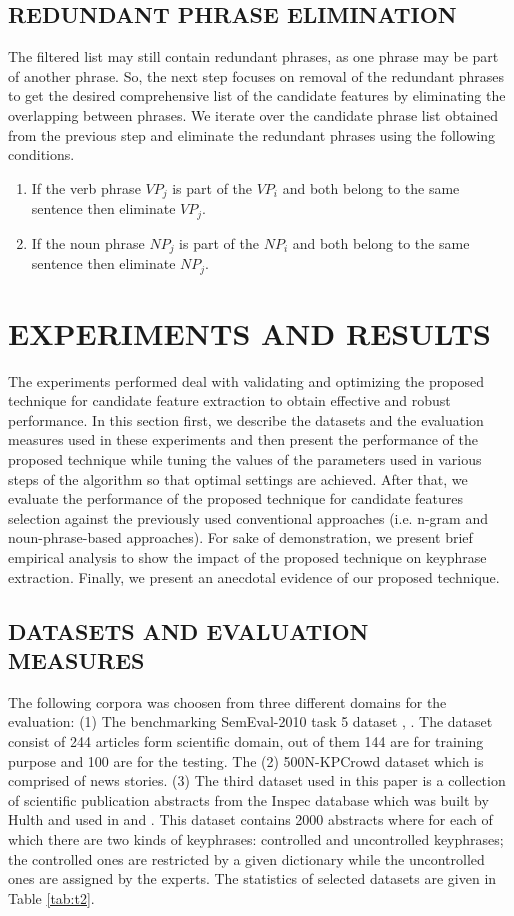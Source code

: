 \documentclass{ieeeaccess}
\begin{document}
\subsection{REDUNDANT PHRASE ELIMINATION}
The filtered list may still contain redundant phrases, as one phrase may be part of another phrase. So, the next step focuses on removal of the redundant phrases to get the desired comprehensive list of the candidate features by eliminating the overlapping between phrases. We iterate over the candidate phrase list obtained from the previous step and eliminate the redundant phrases using the following conditions.
\begin{enumerate}
	\item
{If the verb phrase $VP_{j}$ is part of the $VP_{i}$ and both belong to the same sentence then eliminate $VP_{j}$.}

	\item
{If the noun phrase $NP_{j}$ is part of the $NP_{i}$ and both belong to the same sentence then eliminate $NP_{j}$.}
\end{enumerate}

\section{EXPERIMENTS AND RESULTS}
The experiments performed deal with validating and optimizing the proposed technique for candidate feature extraction to obtain effective and robust performance. In this section first, we describe the datasets and the evaluation measures used in these experiments and then present the performance of the proposed technique while tuning the values of the parameters
used in various steps of the algorithm so that optimal settings are achieved. After that, we evaluate the performance of the proposed technique for candidate features selection against the previously used conventional approaches (i.e. n-gram and noun-phrase-based approaches). For sake of demonstration, we present brief empirical analysis to show the impact of the proposed technique on keyphrase extraction. Finally, we present an anecdotal evidence of our proposed technique.

\subsection{DATASETS AND EVALUATION MEASURES}
The following corpora was choosen from three different domains for the evaluation: (1) The benchmarking SemEval-2010 task 5 dataset \cite{b7}, \cite{b8}. The dataset consist of 244 articles form scientific domain, out of them 144 are for  training purpose and 100 are for the testing. The (2) 500N-KPCrowd \cite{b31} dataset which is comprised of news stories. (3) The third dataset used in this paper is a collection of scientific publication abstracts from the Inspec database which was built by Hulth and used in \cite{b17} and \cite{b32}. This dataset contains 2000 abstracts where for each of which there are two kinds of keyphrases: controlled and uncontrolled keyphrases; the controlled ones are restricted by a given dictionary while the uncontrolled ones are assigned by the experts. The statistics of selected datasets are given in Table \ref{tab:t2}.
\end{document}
